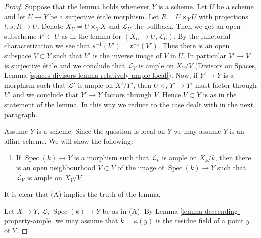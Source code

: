 \documentclass[10pt,a4paper]{amsart}
\theoremstyle{plain}
\theoremstyle{definition}
\theoremstyle{remark}
\numberwithin{equation}{subsection}
\def\Spec{\mathop{\mathrm{Spec}}}
\begin{document}
\begin{proof}
Suppose that the lemma holds whenever $Y$ is a scheme.
Let $U$ be a scheme and let $U \to Y$ be a surjective \'etale morphism.
Let $R = U \times_Y U$ with projections $t, s : R \to U$.
Denote $X_U = U \times_Y X$ and $\mathcal{L}_U$ the pullback.
Then we get an open subscheme $V' \subset U$ as in the lemma
for $(X_U \to U, \mathcal{L}_U)$. By the functorial characterization
we see that $s^{-1}(V') = t^{-1}(V')$.
Thus there is an open subspace $V \subset Y$ such that
$V'$ is the inverse image of $V$ in $U$.
In particular $V' \to V$ is surjective \'etale and we
conclude that $\mathcal{L}_V$ is ample on $X_V/V$
(Divisors on Spaces, Lemma \ref{spaces-divisors-lemma-relatively-ample-local}).
Now, if $Y' \to Y$ is a morphism such that
$\mathcal{L}'$ is ample on $X'/Y'$, then
$U \times_Y Y' \to Y'$ must factor through $V'$
and we conclude that $Y' \to Y$ factors through $V$.
Hence $V \subset Y$ is as in the statement of the lemma.
In this way we reduce to the case dealt with in the next
paragraph.

\medskip\noindent
Assume $Y$ is a scheme. Since the question is local on $Y$
we may assume $Y$ is an affine scheme. We will show the
following:
\begin{enumerate}
\item[(A)] If $\Spec(k) \to Y$ is a morphism such that
$\mathcal{L}_k$ is ample on $X_k/k$, then there is an
open neighbourhood $V \subset Y$ of the image of $\Spec(k) \to Y$
such that $\mathcal{L}_V$ is ample on $X_V/V$.
\end{enumerate}
It is clear that (A) implies the truth of the lemma.

\medskip\noindent
Let $X \to Y$, $\mathcal{L}$, $\Spec(k) \to Y$ be as in (A).
By Lemma \ref{lemma-descending-property-ample}
we may assume that $k = \kappa(y)$ is the residue field of a point $y$
of $Y$.


\end{proof}
\end{document}
